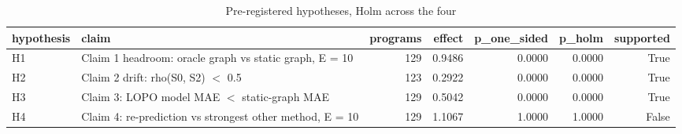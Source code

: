 \begin{table}[t]
\centering
\caption{Pre-registered hypotheses, Holm across the four}
\label{tab:v3-1-primary-hypotheses}
\begin{tabular}{llrrrrr}
\toprule
hypothesis & claim & programs & effect & p\_one\_sided & p\_holm & supported \\
\midrule
H1 & Claim 1 headroom: oracle graph vs static graph, E = 10 & 129 & 0.9486 & 0.0000 & 0.0000 & True \\
H2 & Claim 2 drift: rho(S0, S2) $<$ 0.5 & 123 & 0.2922 & 0.0000 & 0.0000 & True \\
H3 & Claim 3: LOPO model MAE $<$ static-graph MAE & 129 & 0.5042 & 0.0000 & 0.0000 & True \\
H4 & Claim 4: re-prediction vs strongest other method, E = 10 & 129 & 1.1067 & 1.0000 & 1.0000 & False \\
\bottomrule
\end{tabular}
\end{table}

